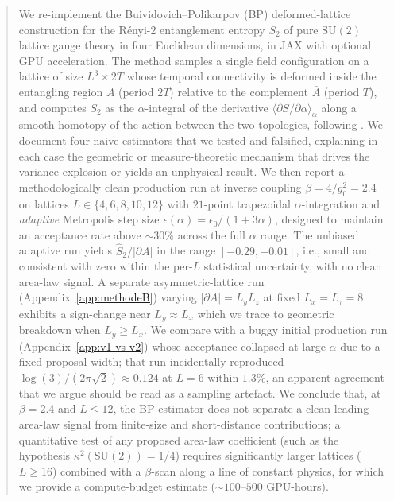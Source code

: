 \documentclass[11pt,a4paper]{article}
\theoremstyle{definition}
\newcommand{\SUtwo}{\mathrm{SU}(2)}
\begin{document}
\begin{abstract}
We re-implement the Buividovich--Polikarpov (BP) deformed-lattice
construction \cite{BP2008b} for the Rényi-$2$ entanglement entropy
$S_2$ of pure $\mathrm{SU}(2)$ lattice gauge theory in four Euclidean
dimensions, in JAX with optional GPU acceleration. The method samples
a single field configuration on a lattice of size $L^3 \times 2T$
whose temporal connectivity is deformed inside the entangling region
$A$ (period $2T$) relative to the complement $\bar A$ (period $T$),
and computes $S_2$ as the $\alpha$-integral of the derivative
$\langle \partial S/\partial \alpha\rangle_\alpha$ along a smooth
homotopy of the action between the two topologies, following
\cite{BP2008b,Rabenstein2019,Rindlisbacher2022}. We document four
naive estimators that we tested and falsified, explaining in each
case the geometric or measure-theoretic mechanism that drives the
variance explosion or yields an unphysical result. We then report a
methodologically clean production run at inverse coupling
$\beta = 4/g_0^2 = 2.4$ on lattices $L \in \{4,6,8,10,12\}$ with
$21$-point trapezoidal $\alpha$-integration and \emph{adaptive}
Metropolis step size $\epsilon(\alpha) = \epsilon_0/(1+3\alpha)$,
designed to maintain an acceptance rate above $\sim 30\%$ across the
full $\alpha$ range. The unbiased adaptive run yields
$\widehat S_2/|\partial A|$ in the range $[-0.29, -0.01]$, i.e.,
small and consistent with zero within the per-$L$ statistical
uncertainty, with no clean area-law signal. A separate
asymmetric-lattice run (Appendix~\ref{app:methodeB}) varying
$|\partial A| = L_y L_z$ at fixed $L_x = L_\tau = 8$ exhibits a
sign-change near $L_y \approx L_x$ which we trace to geometric
breakdown when $L_y \ge L_x$. We compare with a buggy initial
production run (Appendix~\ref{app:v1-vs-v2}) whose acceptance
collapsed at large $\alpha$ due to a fixed proposal width; that run
incidentally reproduced $\log(3)/(2\pi\sqrt 2) \approx 0.124$ at $L =
6$ within $1.3\%$, an apparent agreement that we argue should be
read as a sampling artefact. We conclude that, at $\beta = 2.4$ and
$L \le 12$, the BP estimator does not separate a clean leading
area-law signal from finite-size and short-distance contributions; a
quantitative test of any proposed area-law coefficient (such as the
hypothesis $\kappa^2(\SUtwo) = 1/4$) requires significantly larger
lattices ($L \ge 16$) combined with a $\beta$-scan along a line of
constant physics, for which we provide a compute-budget estimate
($\sim 100\text{--}500$ GPU-hours).
\end{abstract}
\end{document}
